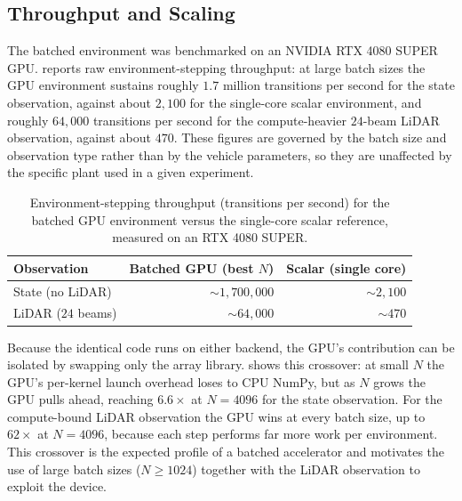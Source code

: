 \subsection{Throughput and Scaling}

The batched environment was benchmarked on an NVIDIA RTX 4080 SUPER GPU.  reports raw environment-stepping throughput: at large batch sizes the GPU environment sustains roughly $1.7$ million transitions per second for the state observation, against about $2{,}100$ for the single-core scalar environment, and roughly $64{,}000$ transitions per second for the compute-heavier $24$-beam LiDAR observation, against about $470$. These figures are governed by the batch size and observation type rather than by the vehicle parameters, so they are unaffected by the specific plant used in a given experiment.

\begin{table}[H]
\centering
\caption{Environment-stepping throughput (transitions per second) for the batched GPU environment versus the single-core scalar reference, measured on an RTX 4080 SUPER.}
\label{tab:sim_throughput}
\begin{tabular}{lrr}
\toprule
Observation & Batched GPU (best $N$) & Scalar (single core) \\
\midrule
State (no LiDAR) & $\sim\!1{,}700{,}000$ & $\sim\!2{,}100$ \\
LiDAR ($24$ beams) & $\sim\!64{,}000$ & $\sim\!470$ \\
\bottomrule
\end{tabular}
\end{table}

Because the identical code runs on either backend, the GPU's contribution can be isolated by swapping only the array library.  shows this crossover: at small $N$ the GPU's per-kernel launch overhead loses to CPU NumPy, but as $N$ grows the GPU pulls ahead, reaching $6.6\times$ at $N=4096$ for the state observation. For the compute-bound LiDAR observation the GPU wins at every batch size, up to $62\times$ at $N=4096$, because each step performs far more work per environment. This crossover is the expected profile of a batched accelerator and motivates the use of large batch sizes ($N \geq 1024$) together with the LiDAR observation to exploit the device.

